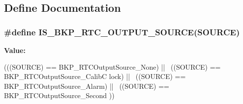 \subsection{Define Documentation}
\hypertarget{group__RTC__output__source__to__output__on__the__Tamper__pin_gac59454ee255feb55b5e14c34b70c99da}{
\subsubsection[{IS\_\-BKP\_\-RTC\_\-OUTPUT\_\-SOURCE}]{\setlength{\rightskip}{0pt plus 5cm}\#define IS\_\-BKP\_\-RTC\_\-OUTPUT\_\-SOURCE(SOURCE)}}
\label{group__RTC__output__source__to__output__on__the__Tamper__pin_gac59454ee255feb55b5e14c34b70c99da}
{\bfseries Value:}
\begin{DoxyCode}
(((SOURCE) == BKP_RTCOutputSource_None) || \
                                          ((SOURCE) == BKP_RTCOutputSource_CalibC
      lock) || \
                                          ((SOURCE) == BKP_RTCOutputSource_Alarm)
       || \
                                          ((SOURCE) == BKP_RTCOutputSource_Second
      ))
\end{DoxyCode}
